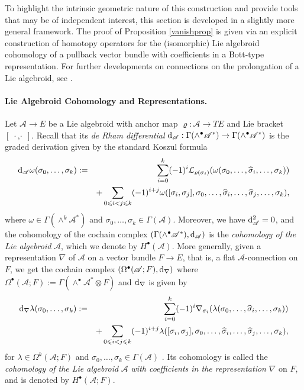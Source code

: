 \documentclass[12pt,letterpaper]{article}
\newcommand{\A}{\mathscr{A}}
\let\oldd\d
\renewcommand{\d}{%
  \relax\ifmmode\mathrm{d}\else\oldd\fi
}
\DeclareMathOperator{\dcd}{\,\cdot\,,\cdot\,}
\renewcommand{\hat}{\widehat}
\numberwithin{equation}{section}
\begin{document}
To highlight the intrinsic geometric nature of this construction and provide tools that may be of independent interest,
this section is developed in a slightly more general framework.
The proof of Proposition \ref{vanishprop} is given via an explicit construction of homotopy operators for the (isomorphic) Lie algebroid cohomology 
of a pullback vector bundle with coefficients in a Bott-type representation.
For further developments on connections on the prolongation of a Lie algebroid, see \cite{popescu2008}.


\paragraph{Lie Algebroid Cohomology and Representations.}
Let $\A\to E$ be a Lie algebroid with anchor map $\varrho:\A\to TE$ and Lie bracket $[\dcd]$.
Recall that its \emph{de Rham differential} 
$\d_\A:\Gamma(\wedge^{\bullet}\A^*)\to\Gamma(\wedge^{\bullet}\A^*)$
is the graded derivation
given by the standard Koszul formula 
\begin{eqnarray}
  \d_\A\omega(\sigma_0,\ldots,\sigma_k) &:= & \sum_{i=0}^{k}(-1)^i\mathcal{L}_{\varrho(\sigma_i)}(\omega(\sigma_0,\ldots,\hat{\sigma}_i,\ldots,\sigma_k))\nonumber \\
  && + \sum_{0\leqslant i<j \leqslant k}(-1)^{i+j}\omega([\sigma_i,\sigma_j],\sigma_0,\ldots,\hat{\sigma}_i,\ldots,\hat{\sigma}_j,\ldots,\sigma_k),\label{diff-ext-operator}
\end{eqnarray}
where $\omega\in\Gamma(\wedge^k\A^*)$ and $\sigma_0,\ldots,\sigma_k\in\Gamma(\A)$.
Moreover, we have $\d_\A^2=0$, and the cohomology of the cochain complex $(\Gamma(\wedge^{\bullet}\A^*),\d_\A)$ 
is the \emph{cohomology of the Lie algebroid} $\A$, which we denote by $H^\bullet(\A)$.
More generally, given a representation $\nabla$ of $\A$ on a vector bundle $F\to E$, that is, a flat $\A$-connection on $F$,
we get the cochain complex $(\Omega^\bullet(\A;F),\d_\nabla)$
where $\Omega^\bullet(\A;F):=\Gamma(\wedge^{\bullet}\A^*\otimes F)$ and $\d_\nabla$ is given by
\begin{eqnarray}
  \d_\nabla\lambda(\sigma_0,\ldots,\sigma_k) &:= & \sum_{i=0}^{k}(-1)^i\nabla_{\sigma_i}(\lambda(\sigma_0,\ldots,\hat{\sigma}_i,\ldots,\sigma_k))\nonumber \\
 & & + \sum_{0\leqslant i<j \leqslant k}(-1)^{i+j}\lambda([\sigma_i,\sigma_j],\sigma_0,\ldots,\hat{\sigma}_i,\ldots,\hat{\sigma}_j,\ldots,\sigma_k),\label{diffoper-connection}
\end{eqnarray}
for $\lambda\in\Omega^k(\A;F)$ and $\sigma_0,\ldots,\sigma_k\in\Gamma(\A)$ 
\cite[Chapter 7]{Mackenzie2005}.
Its cohomology is called the \emph{cohomology of the Lie algebroid} $\A$ \emph{with coefficients in the representation} $\nabla$ on $F$,
and is denoted by $H^\bullet(\A;F)$.
\end{document}
